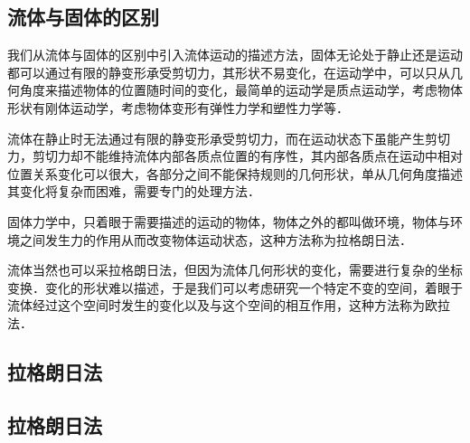 \subsection{流体与固体的区别}
我们从流体与固体的区别中引入流体运动的描述方法，固体无论处于静止还是运动都可以通过有限的静变形承受剪切力，其形状不易变化，在运动学中，可以只从几何角度来描述物体的位置随时间的变化，最简单的运动学是质点运动学，考虑物体形状有刚体运动学，考虑物体变形有弹性力学和塑性力学等．

流体在静止时无法通过有限的静变形承受剪切力，而在运动状态下虽能产生剪切力，剪切力却不能维持流体内部各质点位置的有序性，其内部各质点在运动中相对位置关系变化可以很大，各部分之间不能保持规则的几何形状，单从几何角度描述其变化将复杂而困难，需要专门的处理方法．

固体力学中，只着眼于需要描述的运动的物体，物体之外的都叫做环境，物体与环境之间发生力的作用从而改变物体运动状态，这种方法称为拉格朗日法．

流体当然也可以采拉格朗日法，但因为流体几何形状的变化，需要进行复杂的坐标变换．变化的形状难以描述，于是我们可以考虑研究一个特定不变的空间，着眼于流体经过这个空间时发生的变化以及与这个空间的相互作用，这种方法称为欧拉法．

\subsection{拉格朗日法}

\subsection{拉格朗日法}